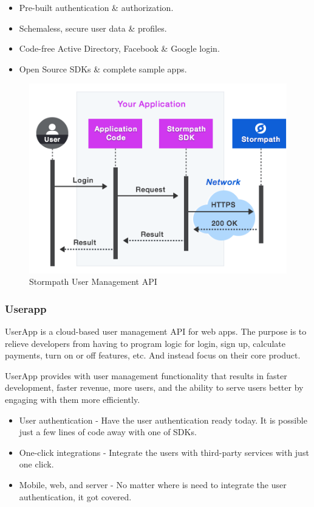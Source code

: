 \begin{itemize}
\item Pre-built authentication \& authorization.
\item Schemaless, secure user data \& profiles.
\item Code-free Active Directory, Facebook \& Google login.
\item Open Source SDKs \& complete sample apps.
\end{itemize}

\begin {figure}[h]
\graphicspath{{images/chapter_USR/}}
\includegraphics[width=\textwidth]{stormpath}
\caption{Stormpath User Management API}
\end {figure}

\subsubsection{Userapp}

UserApp is a cloud-based user management API for web apps. The purpose is to relieve developers from having to program logic for login, sign up, calculate payments, turn on or off features, etc. And instead focus on their core product.

UserApp provides with user management functionality that results in faster development, faster revenue, more users, and the ability to serve users better by engaging with them more efficiently.\cite{usr_userapp}

\begin{itemize}
\item User authentication - Have the user authentication ready today. It is possible just a few lines of code away with one of SDKs.
\item One-click integrations - Integrate the users with third-party services with just one click.
\item Mobile, web, and server - No matter where is need to integrate the user authentication, it got  covered.
\end{itemize}

